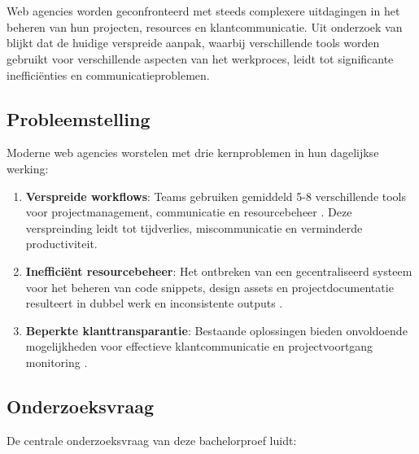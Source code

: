 
\chapter{}
\label{ch:inleiding}

Web agencies worden geconfronteerd met steeds complexere uitdagingen in het beheren van hun projecten, resources en klantcommunicatie. Uit onderzoek van \textcite{Reid2014} blijkt dat de huidige verspreide aanpak, waarbij verschillende tools worden gebruikt voor verschillende aspecten van het werkproces, leidt tot significante inefficiënties en communicatieproblemen.

\section{Probleemstelling}
\label{sec:probleemstelling}

Moderne web agencies worstelen met drie kernproblemen in hun dagelijkse werking:

\begin{enumerate}
    \item \textbf{Verspreide workflows}: Teams gebruiken gemiddeld 5-8 verschillende tools voor projectmanagement, communicatie en resourcebeheer \autocite{Alexander2019}. Deze verspreinding leidt tot tijdverlies, miscommunicatie en verminderde productiviteit.
    
    \item \textbf{Inefficiënt resourcebeheer}: Het ontbreken van een gecentraliseerd systeem voor het beheren van code snippets, design assets en projectdocumentatie resulteert in dubbel werk en inconsistente outputs \autocite{Wilson2023}.
    
    \item \textbf{Beperkte klanttransparantie}: Bestaande oplossingen bieden onvoldoende mogelijkheden voor effectieve klantcommunicatie en projectvoortgang monitoring \autocite{Zhang2024}.
\end{enumerate}

\section{Onderzoeksvraag}
\label{sec:onderzoeksvraag}

De centrale onderzoeksvraag van deze bachelorproef luidt:

